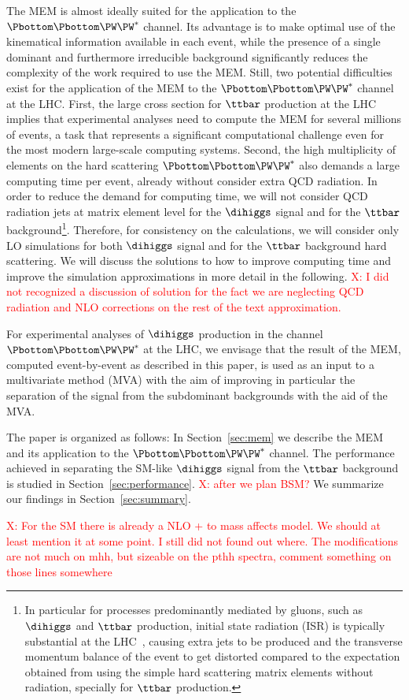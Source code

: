 The MEM is almost ideally suited for the application to the $\Pbottom\Pbottom\PW\PW^{*}$ channel.
Its advantage is to make optimal use of the kinematical information available in each event,
while the presence of a single dominant and furthermore irreducible background significantly reduces the complexity of the work required to use the MEM. 
Still, two potential difficulties exist for the application of the MEM to the $\Pbottom\Pbottom\PW\PW^{*}$ channel at the LHC.
First, the large cross section for $\ttbar$ production at the LHC implies that experimental analyses need to compute the MEM for several millions of events,
a task that represents a significant computational challenge even for the most modern large-scale computing systems. Second, the high multiplicity of elements on the hard scattering $\Pbottom\Pbottom\PW\PW^{*}$ also demands a large computing time per event, already without consider extra QCD radiation. 
 In order to reduce the demand for computing time,
we will not consider QCD radiation jets at matrix element level for the $\dihiggs$ signal and for the $\ttbar$ background\footnote{In particular for processes predominantly mediated by gluons, such as $\dihiggs$ and $\ttbar$ production,
initial state radiation (ISR) is typically substantial at the LHC~\cite{Alwall:2010cq},
causing extra jets to be produced and the transverse momentum balance of the event to get distorted compared to the expectation obtained from using the simple hard scattering matrix elements without radiation, specially for $\ttbar$ production.}.
 Therefore, for consistency on the calculations, we will consider only LO simulations for both  $\dihiggs$ signal and for the $\ttbar$ background hard scattering. 
We will discuss the solutions to  how to improve computing time and improve the simulation approximations in more detail in the following. \textcolor{red}{X: I did not recognized a discussion of solution for the fact we are neglecting QCD radiation and NLO corrections on the rest of the text approximation.} 

For experimental analyses of $\dihiggs$ production in the channel $\Pbottom\Pbottom\PW\PW^{*}$ at the LHC,
we envisage that the result of the MEM, computed event-by-event as described in this paper, 
is used as an input to a multivariate method (MVA) 
with the aim of improving in particular the separation of the signal from the subdominant backgrounds with the aid of the MVA.  

The paper is organized as follows:
In Section~\ref{sec:mem} we describe the MEM and its application to the $\Pbottom\Pbottom\PW\PW^{*}$ channel.
The performance achieved in separating the SM-like $\dihiggs$ signal from the $\ttbar$ background is studied in Section~\ref{sec:performance}. 
\textcolor{red}{X: after we plan BSM? } 
We summarize our findings in Section~\ref{sec:summary}.

\textcolor{red}{X: For the SM there is already a NLO + to mass affects model. We should at least mention it at some point. I still did not found out where. The modifications are not much on mhh, but sizeable on the pthh spectra, comment something on those lines somewhere}